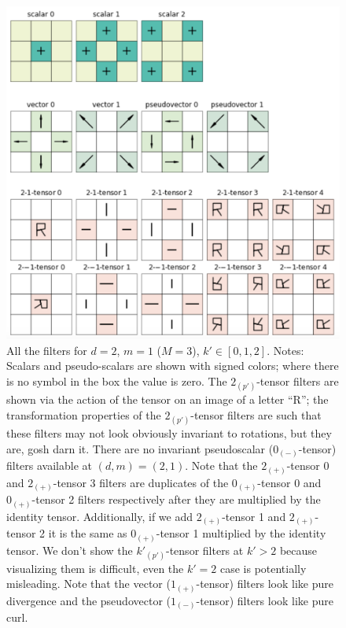 \documentclass{article}
\newenvironment{hoggfigure}{%
  \begin{figure}[tp]%
    \begin{mdframed}%
    \color{captiongray}}{%
    \end{mdframed}%
  \end{figure}}
\theoremstyle{definition}
\newcommand{\tensorname}[2]{{#1}_{(#2)}}
\newcommand{\tensor}[2]{$\tensorname{#1}{#2}$-tensor}
\begin{document}
\begin{hoggfigure}
  \begin{center}
\includegraphics[width=\textwidth]{pics/invariant_filters.png}
  \end{center}
\caption{All the filters for $d=2$, $m=1$ ($M=3$), $k'\in [0,1,2]$.
Notes: Scalars and pseudo-scalars are shown with signed colors; where there is no symbol in the box the value is zero. The \tensor{2}{p'} filters are shown via the action of the tensor on an image of a letter ``R''; the transformation properties of the \tensor{2}{p'} filters are such that these filters may not look obviously invariant to rotations, but they are, gosh darn it.
There are no invariant pseudoscalar (\tensor{0}{-}) filters available at $(d,m) = (2,1)$.
Note that the \tensor{2}{+} 0 and \tensor{2}{+} 3 filters are duplicates of the \tensor{0}{+} 0 and \tensor{0}{+} 2 filters respectively after they are multiplied by the identity tensor. Additionally, if we add \tensor{2}{+} 1 and \tensor{2}{+} 2 it is the same as \tensor{0}{+} 1 multiplied by the identity tensor. We don't show the \tensor{k'}{p'} filters at $k'>2$ because visualizing them is difficult, even the $k'=2$ case is potentially misleading.
Note that the vector (\tensor{1}{+}) filters look like pure divergence and the pseudovector (\tensor{1}{-}) filters look like pure curl.\label{fig:filters23}}
\end{hoggfigure}
\end{document}

